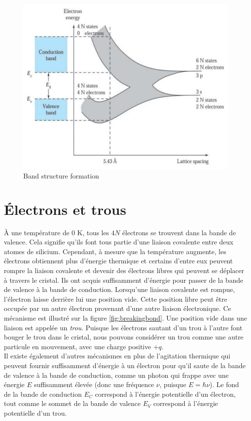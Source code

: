 \begin{figure}[h!]
\centering
\includegraphics[width=12cm]{figures/ch01/bandstructure.jpg}
\caption{Band structure formation}
\label{fig:bandstructure}
\end{figure} 

\section{Électrons et trous}
À une température de $0$ K, tous les $4N$ électrons se trouvent dans la bande de valence. Cela signifie qu'ils font tous partie d'une liaison covalente entre deux atomes de silicium. Cependant, à mesure que la température augmente, les électrons obtiennent plus d'énergie thermique et certains d'entre eux peuvent rompre la liaison covalente et devenir des électrons libres qui peuvent se déplacer à travers le cristal. Ils ont acquis suffisamment d'énergie pour passer de la bande de valence à la bande de conduction. Lorsqu'une liaison covalente est rompue, l'électron laisse derrière lui une position vide. Cette position libre peut être occupée par un autre électron provenant d'une autre liaison électronique. Ce mécanisme est illustré sur la figure \ref{fig:breakingbond}. Une position vide dans une liaison est appelée un \emph{trou}. Puisque les électrons sautant d'un trou à l'autre font bouger le trou dans le cristal, nous pouvons considérer un trou comme une autre particule en mouvement, avec une charge positive $+q$.\\
Il existe également d'autres mécanismes en plus de l'agitation thermique qui peuvent fournir suffisamment d'énergie à un électron pour qu'il saute de la bande de valence à la bande de conduction, comme un photon qui frappe avec une énergie $E$ suffisamment élevée (donc une fréquence $\nu$, puisque $E = \hbar \nu$). Le fond de la bande de conduction $E_C$ correspond à l'énergie potentielle d'un électron, tout comme le sommet de la bande de valence $E_V$ correspond à l'énergie potentielle d'un trou.

